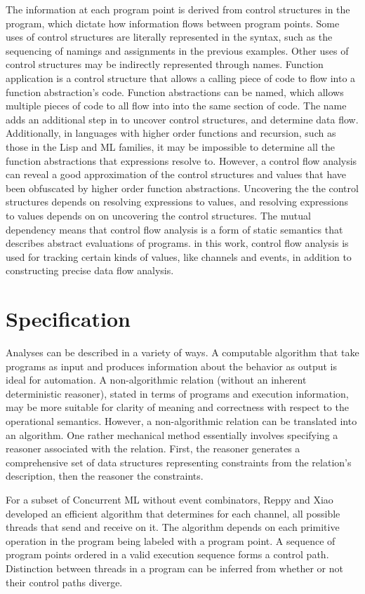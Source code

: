\documentclass{article}
\begin{document}
The information at each program point is derived from control structures in the program, which
dictate how information flows between program points. Some uses of control structures are
literally represented in the syntax, such as the sequencing of namings and assignments in the
previous examples. Other uses of control structures may be indirectly represented through
names. Function application is a control structure that allows a calling piece of code to
flow into a function abstraction's code.  Function abstractions can be named, which allows
multiple pieces of code to all flow into into the same section of code. The name adds an
additional step in to uncover control structures, and determine data flow.
Additionally, in languages with higher order functions and recursion, such as those in the Lisp
and ML families, it may be impossible to determine all the function abstractions that
expressions resolve to. However, a control flow analysis can reveal a good
approximation of the control structures and values that have been obfuscated by higher order
function abstractions.  Uncovering the the control structures depends on resolving expressions
to values, and resolving expressions to values depends on on uncovering the control
structures. The mutual dependency means that control flow analysis is a form of
static semantics that describes abstract evaluations of programs. in this work, control flow
analysis is used for tracking certain kinds of values, like channels and events, in addition to
constructing precise data flow analysis. 

\section{Specification}
Analyses can be described in a variety of ways. A computable algorithm that take programs
as input and produces information about the behavior as output is ideal for automation. A
non-algorithmic relation (without an inherent deterministic reasoner),
stated in terms of programs and execution information, may be
more suitable for clarity of meaning and correctness with respect to the operational
semantics. However, a non-algorithmic relation can be translated into an algorithm.
One rather mechanical method essentially involves
specifying a reasoner associated with the relation. 
First, the reasoner generates a comprehensive set of data structures representing
constraints from the relation's description, then the reasoner the constraints.

For a subset of Concurrent ML without event combinators, Reppy and Xiao developed an
efficient algorithm that determines for each channel, all possible threads that send
and receive on it. The algorithm depends on each primitive operation in the program being
labeled with a program point. A sequence of program points ordered in a valid execution
sequence forms a control path. Distinction between threads in a program can be inferred from
whether or not their control paths diverge.  
\end{document}
